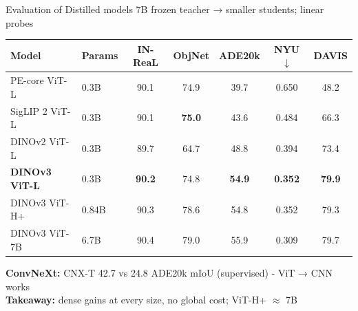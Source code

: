 \begin{frame}{Evaluation of Distilled models}
    7B frozen teacher → smaller students; linear probes
    \vspace{5px}
    \begin{table}
        \centering
        \footnotesize
        \setlength{\tabcolsep}{4pt}
        \begin{tabular}{l l c c c c c}
            \toprule[1.5pt]
            \textbf{Model} & \textbf{Params} & \textbf{IN-ReaL} & \textbf{ObjNet} & \textbf{ADE20k} & \textbf{NYU $\downarrow$} & \textbf{DAVIS} \\
            \midrule[1.5pt]
            PE-core ViT-L & 0.3B & 90.1 & 74.9 & 39.7 & 0.650 & 48.2 \\
            SigLIP 2 ViT-L & 0.3B & 90.1 & \textbf{75.0} & 43.6 & 0.484 & 66.3 \\
            DINOv2 ViT-L & 0.3B & 89.7 & 64.7 & 48.8 & 0.394 & 73.4 \\
            \textbf{DINOv3 ViT-L} & 0.3B & \textbf{90.2} & 74.8 & \textbf{54.9} & \textbf{0.352} & \textbf{79.9} \\
            \midrule
            DINOv3 ViT-H+ & 0.84B & 90.3 & 78.6 & 54.8 & 0.352 & 79.3 \\
            DINOv3 ViT-7B & 6.7B & 90.4 & 79.0 & 55.9 & 0.309 & 79.7 \\
            \bottomrule[1.5pt]
        \end{tabular}
    \end{table}
    \vspace{5px}
    \textbf{ConvNeXt:} CNX-T 42.7 vs 24.8 ADE20k mIoU (supervised) - ViT → CNN works\\
    \vspace{5px}
    \textbf{Takeaway:} dense gains at every size, no global cost; ViT-H+ $\approx$ 7B
\end{frame}


